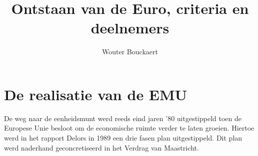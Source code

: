 \documentclass[a4paper]{article}
\begin{document}
\title{Ontstaan van de Euro, criteria en deelnemers}
\author{Wouter Bouckaert}
\maketitle

\section{De realisatie van de EMU}

De weg naar de eenheidsmunt werd reeds eind jaren '80 uitgestippeld
toen de Europese Unie besloot om de economische ruimte verder te
laten groeien. Hiertoe werd in het rapport Delors in 1989 een drie
fasen plan uitgestippeld. Dit plan werd naderhand geconcretiseerd in
het Verdrag van Maastricht.
\end{document}

